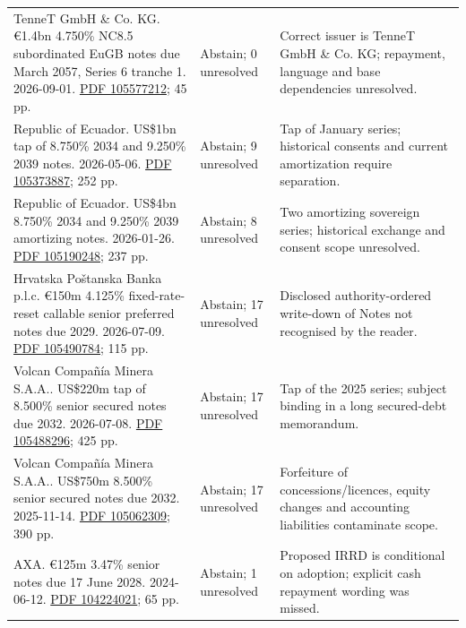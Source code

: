 \documentclass[12pt,a4paper,oneside,openany]{book}
\begin{document}
{\begin{longtable}{P{0.44\textwidth}P{0.12\textwidth}P{0.34\textwidth}}
TenneT GmbH \& Co. KG. €1.4bn 4.750\% NC8.5 subordinated EuGB notes due March 2057, Series 6 tranche 1. 2026-09-01. \href{../prospectus/difficulty-2026-10-04/pdfs/case-105577212.pdf}{PDF 105577212}; 45 pp. & Abstain; 0 unresolved & Correct issuer is TenneT GmbH \& Co. KG; repayment, language and base dependencies unresolved. \\

Republic of Ecuador. US\$1bn tap of 8.750\% 2034 and 9.250\% 2039 notes. 2026-05-06. \href{../prospectus/difficulty-2026-10-04/pdfs/case-105373887.pdf}{PDF 105373887}; 252 pp. & Abstain; 9 unresolved & Tap of January series; historical consents and current amortization require separation. \\

Republic of Ecuador. US\$4bn 8.750\% 2034 and 9.250\% 2039 amortizing notes. 2026-01-26. \href{../prospectus/difficulty-2026-10-04/pdfs/case-105190248.pdf}{PDF 105190248}; 237 pp. & Abstain; 8 unresolved & Two amortizing sovereign series; historical exchange and consent scope unresolved. \\

Hrvatska Poštanska Banka p.l.c. €150m 4.125\% fixed-rate-reset callable senior preferred notes due 2029. 2026-07-09. \href{../prospectus/difficulty-2026-10-04/pdfs/case-105490784.pdf}{PDF 105490784}; 115 pp. & Abstain; 17 unresolved & Disclosed authority-ordered write-down of Notes not recognised by the reader. \\

Volcan Compañía Minera S.A.A.. US\$220m tap of 8.500\% senior secured notes due 2032. 2026-07-08. \href{../prospectus/difficulty-2026-10-04/pdfs/case-105488296.pdf}{PDF 105488296}; 425 pp. & Abstain; 17 unresolved & Tap of the 2025 series; subject binding in a long secured-debt memorandum. \\

Volcan Compañía Minera S.A.A.. US\$750m 8.500\% senior secured notes due 2032. 2025-11-14. \href{../prospectus/difficulty-2026-10-04/pdfs/case-105062309.pdf}{PDF 105062309}; 390 pp. & Abstain; 17 unresolved & Forfeiture of concessions/licences, equity changes and accounting liabilities contaminate scope. \\

AXA. €125m 3.47\% senior notes due 17 June 2028. 2024-06-12. \href{../prospectus/difficulty-2026-10-04/pdfs/case-104224021.pdf}{PDF 104224021}; 65 pp. & Abstain; 1 unresolved & Proposed IRRD is conditional on adoption; explicit cash repayment wording was missed. \\
\bottomrule
\end{longtable}
}
\end{document}
